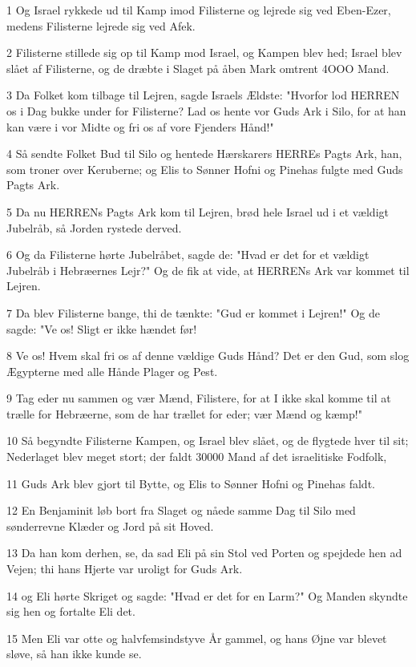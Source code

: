 \par 1 Og Israel rykkede ud til Kamp imod Filisterne og lejrede sig ved Eben-Ezer, medens Filisterne lejrede sig ved Afek.
\par 2 Filisterne stillede sig op til Kamp mod Israel, og Kampen blev hed; Israel blev slået af Filisterne, og de dræbte i Slaget på åben Mark omtrent 4OOO Mand.
\par 3 Da Folket kom tilbage til Lejren, sagde Israels Ældste: "Hvorfor lod HERREN os i Dag bukke under for Filisterne? Lad os hente vor Guds Ark i Silo, for at han kan være i vor Midte og fri os af vore Fjenders Hånd!"
\par 4 Så sendte Folket Bud til Silo og hentede Hærskarers HERREs Pagts Ark, han, som troner over Keruberne; og Elis to Sønner Hofni og Pinehas fulgte med Guds Pagts Ark.
\par 5 Da nu HERRENs Pagts Ark kom til Lejren, brød hele Israel ud i et vældigt Jubelråb, så Jorden rystede derved.
\par 6 Og da Filisterne hørte Jubelråbet, sagde de: "Hvad er det for et vældigt Jubelråb i Hebræernes Lejr?" Og de fik at vide, at HERRENs Ark var kommet til Lejren.
\par 7 Da blev Filisterne bange, thi de tænkte: "Gud er kommet i Lejren!" Og de sagde: "Ve os! Sligt er ikke hændet før!
\par 8 Ve os! Hvem skal fri os af denne vældige Guds Hånd? Det er den Gud, som slog Ægypterne med alle Hånde Plager og Pest.
\par 9 Tag eder nu sammen og vær Mænd, Filistere, for at I ikke skal komme til at trælle for Hebræerne, som de har trællet for eder; vær Mænd og kæmp!"
\par 10 Så begyndte Filisterne Kampen, og Israel blev slået, og de flygtede hver til sit; Nederlaget blev meget stort; der faldt 30000 Mand af det israelitiske Fodfolk,
\par 11 Guds Ark blev gjort til Bytte, og Elis to Sønner Hofni og Pinehas faldt.
\par 12 En Benjaminit løb bort fra Slaget og nåede samme Dag til Silo med sønderrevne Klæder og Jord på sit Hoved.
\par 13 Da han kom derhen, se, da sad Eli på sin Stol ved Porten og spejdede hen ad Vejen; thi hans Hjerte var uroligt for Guds Ark.
\par 14 og Eli hørte Skriget og sagde: "Hvad er det for en Larm?" Og Manden skyndte sig hen og fortalte Eli det.
\par 15 Men Eli var otte og halvfemsindstyve År gammel, og hans Øjne var blevet sløve, så han ikke kunde se.
